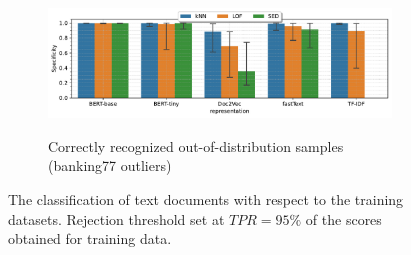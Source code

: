 \begin{figure}[t]
    \vspace{-0.5em}
    \begin{subfigure}[b]{0.9\textwidth}
        \centering
        \caption{\small Correctly recognized out-of-distribution samples (banking77 outliers)}
        \includegraphics[width=\textwidth]{images/real-classification/barplot-banking77-spec_95(representation,model)-representation_BERT-base,BERT-tiny,Doc2Vec,fastText,TF-IDF-class_0,61-data_outlier.pdf}
        \label{fig:banking77-specificity}
    \end{subfigure}

    \caption{The classification of text documents with respect to the training datasets. Rejection threshold set at $TPR = 95\%$ of the scores obtained for training data.}
    \label{fig:text-classification}
    \vspace{-1.5em}
\end{figure}

\cleardoublepage{}
